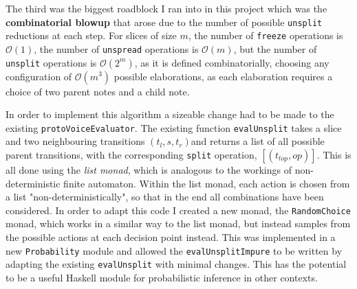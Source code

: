 \documentclass[12pt,a4paper,twoside,openany]{report} \usepackage[pdfborder={0 0 0}]{hyperref}    %
\theoremstyle{definition} \newtheorem{definition}{Definition}[section]
\begin{document}
The third was the biggest roadblock I ran into in this project which was the \textbf{combinatorial blowup} that arose due to the number of possible
\texttt{unsplit} reductions at each step. For slices of size $m$, the number of \texttt{freeze}
operations is $\mathcal{O}(1)$, the number of \texttt{unspread} operations is $\mathcal{O}(m)$, but the number of
\texttt{unsplit} operations is $\mathcal{O}(2^m)$, as it is defined combinatorially, choosing any configuration of
$\mathcal{O}(m^3)$ possible elaborations, as each elaboration requires a choice of two parent notes and a child note.

In order to implement this algorithm a sizeable change had to be made to the existing \texttt{protoVoiceEvaluator}. The
existing function \texttt{evalUnsplit} takes a slice and two neighbouring transitions $(t_l,s,t_r)$and returns a list of
all possible parent transitions, with the corresponding \texttt{split} operation, $[(t_{top}, op)]$. This is all done
using the \textit{list monad}, which is analogous to the workings of non-deterministic finite automaton. Within the list
monad, each action is chosen from a list "non-deterministically", so that in the end all combinations have been
considered. In order to adapt this code I created a new monad, the \texttt{RandomChoice} monad, which works in a similar
way to the list monad, but instead samples from the possible actions at each decision point instead. This was
implemented in a new \texttt{Probability} module and allowed the \texttt{evalUnsplitImpure} to be written by adapting
the existing
\texttt{evalUnsplit} with minimal changes. This has the potential to be a useful Haskell module for probabilistic
inference in other contexts.
\end{document}
